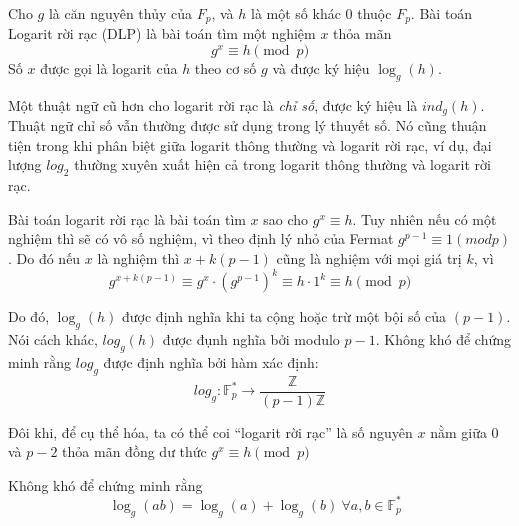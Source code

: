 \begin{definition}
	Cho $g$ là căn nguyên thủy của $F_p$, và $h$ là một số khác 0 thuộc $F_p$. Bài toán Logarit rời rạc (DLP) là bài toán tìm một nghiệm $x$ thỏa mãn
	$$ g^x \equiv h \pmod{p} $$
	Số $x$ được gọi là logarit của $h$ theo cơ số $g$ và được ký hiệu $\log_g(h)$.
\end{definition}

\begin{remark}
	Một thuật ngữ cũ hơn cho logarit rời rạc là \textit{chỉ số}, được ký hiệu là
	$ind_g(h)$. Thuật ngữ chỉ số vẫn thường được sử dụng trong lý thuyết số. Nó cũng
	thuận tiện trong khi phân biệt giữa logarit thông thường và logarit rời rạc, ví dụ, đại
	lượng $log_2$ thường xuyên xuất hiện cả trong logarit thông thường và logarit rời rạc.
\end{remark}

\begin{remark}
	Bài toán logarit rời rạc là bài toán tìm $x$ sao cho $g^x \equiv h$. Tuy nhiên nếu
	có một nghiệm thì sẽ có vô số nghiệm, vì theo định lý nhỏ của Fermat $g^{p-1} \equiv 1(mod p)$. Do đó nếu $x$ là nghiệm thì $x + k(p-1)$ cũng là nghiệm với mọi giá trị $k$, vì
	$$ g^{x + k(p-1)} \equiv g^x \cdot (g^{p-1})^k \equiv h  \cdot 1^k \equiv h \pmod{p} $$
\end{remark}
Do đó, $\log_g(h)$ được định nghĩa khi ta cộng hoặc trừ một bội số của $(p-1)$. Nói
cách khác, $log_g(h)$ được đụnh nghĩa bởi modulo $p-1$. Không khó để chứng minh
rằng $log_g$ được định nghĩa bởi hàm xác định:
$$ log_g: \mathbb{F}^*_p \rightarrow \frac{\mathbb{Z}}{(p-1)\mathbb{Z}} $$

Đôi khi, để cụ thể hóa, ta có thể coi  ``logarit rời rạc'' là số nguyên $x$ nằm giữa $0$ và $p - 2$ thỏa mãn đồng
dư thức $g^x \equiv h \pmod{p}$

\begin{remark}
	Không khó để chứng minh rằng
	$$ \log_g(ab) = \log_g(a) + \log_g(b) \ \text{$\forall a, b \in \mathbb{F}^*_p$ } $$
\end{remark}

